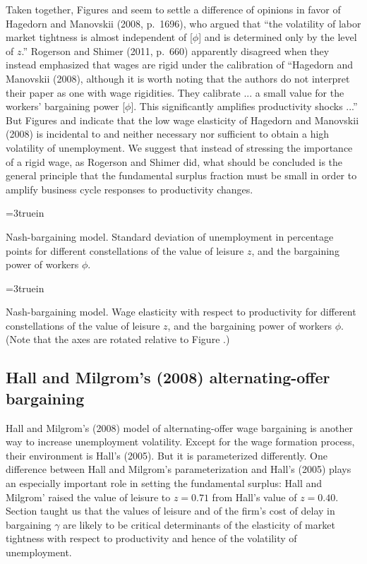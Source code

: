 Taken together, Figures  and 
seem to settle a difference of opinions in favor of  Hagedorn and Manovskii (2008, p.~1696), who argued
that ``the volatility of labor market tightness is almost independent
of [$\phi$] and is determined only by the level of $z$.''
Rogerson and Shimer (2011, p.~660) apparently disagreed when they instead  emphasized
that wages are rigid under the calibration of ``Hagedorn and
Manovskii (2008), although it is worth noting that the authors
do not interpret their paper as one with wage rigidities. They
calibrate ... a small value for the workers' bargaining power
[$\phi$]. This significantly amplifies productivity shocks ...''
But Figures  and  indicate that  the low wage elasticity of
Hagedorn and Manovskii (2008)
is incidental to and neither necessary nor sufficient to obtain
a high volatility of unemployment. We suggest that instead of stressing the importance of a rigid wage, as Rogerson and Shimer
did, what should be concluded is the general principle that
the fundamental surplus fraction must be small in order to amplify business cycle responses to productivity changes.

\centerline{\epsfxsize=3truein}
\caption{Nash-bargaining model. Standard deviation of unemployment in
percentage points for different
constellations of the value of leisure $z$, and the bargaining
power of workers $\phi$.}
\endfigure

\centerline{\epsfxsize=3truein}
\caption{Nash-bargaining model. Wage elasticity with respect to
productivity for different
constellations of the value of leisure $z$, and the bargaining
power of workers $\phi$. (Note that the axes are rotated relative
to Figure .)}
\endfigure


\subsection{Hall and Milgrom's (2008) alternating-offer bargaining}
           \label{sec:FS_HallMil_simul}%
 Hall and Milgrom's (2008)
model of alternating-offer wage bargaining is another way to
increase unemployment volatility. Except for
the wage formation process, their environment is  Hall's (2005). But it is  parameterized differently.
One difference between  Hall and Milgrom's parameterization and  Hall's (2005) plays  an especially  important role in setting  the
 fundamental surplus: Hall and Milgrom' raised the value of leisure  to $z=0.71$ from Hall's value of $z= 0.40$.
 Section  taught us that
the values of leisure and of  the firm's cost of delay in
bargaining $\gamma$ are likely to be critical determinants of
 the elasticity of market tightness with respect
to productivity and hence of the volatility of unemployment.

